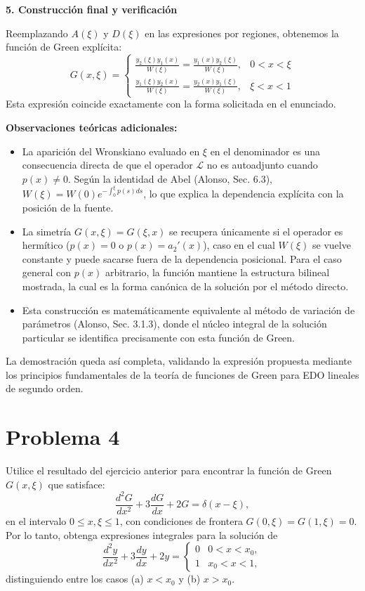\documentclass[a4paper]{article}
\begin{document}
\textbf{5. Construcción final y verificación}

Reemplazando $A(\xi)$ y $D(\xi)$ en las expresiones por regiones, obtenemos la función de Green explícita:
$$ G(x, \xi) = \begin{cases} \displaystyle \frac{y_2(\xi) y_1(x)}{W(\xi)} = \frac{y_1(x) y_2(\xi)}{W(\xi)}, & 0 < x < \xi \\[12pt] \displaystyle \frac{y_1(\xi) y_2(x)}{W(\xi)} = \frac{y_2(x) y_1(\xi)}{W(\xi)}, & \xi < x < 1 \end{cases} $$
Esta expresión coincide exactamente con la forma solicitada en el enunciado. 

\textbf{Observaciones teóricas adicionales:}
\begin{itemize}
  \item La aparición del Wronskiano evaluado en $\xi$ en el denominador es una consecuencia directa de que el operador $\mathscr{L}$ no es autoadjunto cuando $p(x) \neq 0$. Según la identidad de Abel (Alonso, Sec. 6.3), $W(\xi) = W(0) e^{-\int_0^\xi p(s) ds}$, lo que explica la dependencia explícita con la posición de la fuente.
  \item La simetría $G(x, \xi) = G(\xi, x)$ se recupera únicamente si el operador es hermítico ($p(x)=0$ o $p(x) = a_2'(x)$), caso en el cual $W(\xi)$ se vuelve constante y puede sacarse fuera de la dependencia posicional. Para el caso general con $p(x)$ arbitrario, la función mantiene la estructura bilineal mostrada, la cual es la forma canónica de la solución por el método directo.
  \item Esta construcción es matemáticamente equivalente al método de variación de parámetros (Alonso, Sec. 3.1.3), donde el núcleo integral de la solución particular se identifica precisamente con esta función de Green.
\end{itemize}
La demostración queda así completa, validando la expresión propuesta mediante los principios fundamentales de la teoría de funciones de Green para EDO lineales de segundo orden.



\section{Problema 4}
Utilice el resultado del ejercicio anterior para encontrar la función de Green $G(x, \xi)$ que satisface:
$$ \frac{d^2G}{dx^2} + 3 \frac{dG}{dx} + 2G = \delta(x - \xi), $$
en el intervalo $0 \le x, \xi \le 1$, con condiciones de frontera $G(0, \xi) = G(1, \xi) = 0$. Por lo tanto, obtenga expresiones integrales para la solución de
$$ \frac{d^2y}{dx^2} + 3 \frac{dy}{dx} + 2y = \begin{cases} 0 & 0 < x < x_0, \\ 1 & x_0 < x < 1, \end{cases} $$
distinguiendo entre los casos (a) $x < x_0$ y (b) $x > x_0$.
\end{document}
